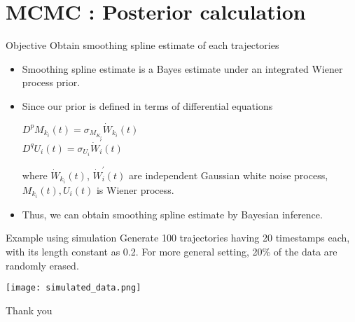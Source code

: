 \documentclass[10pt]{beamer}
\def\mean{M_{k_i}(t)}
\def\dev{U_i(t)}
\begin{document}
\section{MCMC : Posterior calculation}
\begin{frame}[t]{Objective}
\vspace{4pt}
Obtain smoothing spline estimate of each trajectories
\begin{itemize}
\item Smoothing spline estimate is a Bayes estimate under an integrated Wiener process prior.
\item Since our prior is defined in terms of differential equations
\begin{center}
    $D^pM_{k_i}(t)=\sigma_{M_{K_i}}\dot{W}_{k_i}(t)$\\
    $D^qU_i(t)=\sigma_{U_i}\dot{W}_{i}^{'}(t)$
\end{center}
where $\dot{W}_{k_i}(t)$, $\dot{W}_{i}^{'}(t)$ are independent Gaussian white noise process, $\mean, \dev$ is Wiener process.
\item Thus, we can obtain smoothing spline estimate by Bayesian inference.
\end{itemize}
\end{frame}


\begin{frame}[t]{Example using simulation}
\vspace{4pt}
Generate 100 trajectories having 20 timestamps each, with its length constant as 0.2. For more general setting, 20\% of the data are randomly erased.
\begin{center}
\texttt{[image: simulated\_data.png]}
\end{center}
\end{frame}


\begin{frame}[standout]
\flushleft
Thank you
\end{frame}
\end{document}
